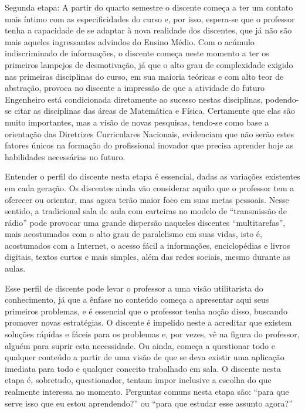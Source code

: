 \documentclass[
	12pt,				%
	openright,			%
	oneside,			%
	a4paper,			%
	english,			%
	brazil				%
	]{abntex2}
\begin{document}
Segunda etapa: A partir do quarto semestre o discente começa a ter um contato mais íntimo com as especificidades do curso e, por isso, espera-se que o professor tenha a capacidade de se adaptar à nova realidade dos discentes, que já não são mais aqueles ingressantes advindos do Ensino Médio. Com o acúmulo indiscriminado de informações, o discente começa neste momento a ter os primeiros lampejos de desmotivação, já que o alto grau de complexidade exigido nas primeiras disciplinas do curso, em sua maioria teóricas e com alto teor de abstração, provoca no discente a impressão de que a atividade do futuro Engenheiro está condicionada diretamente ao sucesso nestas disciplinas, podendo-se citar as disciplinas das áreas de Matemática e Física. Certamente que elas são muito importantes, mas a visão de novas pesquisas, tendo-se como base a orientação das Diretrizes Curriculares Nacionais, evidenciam que não serão estes fatores únicos na formação do profissional inovador que precisa aprender hoje as habilidades necessárias no futuro.

Entender o perfil do discente nesta etapa é essencial, dadas as variações existentes em cada geração. Os discentes ainda vão considerar aquilo que o professor tem a oferecer ou orientar, mas agora terão maior foco em suas metas pessoais. Nesse sentido, a tradicional sala de aula com carteiras no modelo de “transmissão de rádio” pode provocar uma grande dispersão naqueles discentes “multitarefas”, mais acostumados com o alto grau de paralelismo em suas vidas, isto é, acostumados com a Internet, o acesso fácil a informações, enciclopédias e livros digitais, textos curtos e mais simples, além das redes sociais, mesmo durante as aulas.

Esse perfil de discente pode levar o professor a uma visão utilitarista do conhecimento, já que a ênfase no conteúdo começa a apresentar aqui seus primeiros problemas, e é essencial que o professor tenha noção disso, buscando promover novas estratégias. O discente é impelido neste a acreditar que existem soluções rápidas e fáceis para os problemas e, por vezes, vê na figura do professor, alguém para suprir esta necessidade. Ou ainda, começa a questionar todo e qualquer conteúdo a partir de uma visão de que se deva existir uma aplicação imediata para todo e qualquer conceito trabalhado em sala. O discente nesta etapa é, sobretudo, questionador, tentam impor inclusive a escolha do que realmente interessa no momento. Perguntas comuns nesta etapa são: ``para que serve isso que eu estou aprendendo?'' ou ``para que estudar esse assunto agora?''
\end{document}
